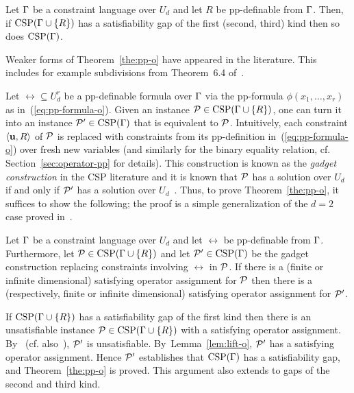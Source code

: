 \begin{theorem}\label{the:pp-o}
  Let $\Gamma$ be a constraint language over $U_d$ and let $R$ be pp-definable from
  $\Gamma$. Then, if ${\rm CSP}(\Gamma\cup\{R\})$ has a satisfiability gap of the first (second, third) kind then so does
  ${\rm CSP}(\Gamma)$.
\end{theorem}

Weaker forms of Theorem~\ref{the:pp-o} have appeared in the literature. This includes for example subdivisions from Theorem~6.4 of~\cite{Mastel24:stoc}.

Let $\rel\subseteq U_d^r$ be a pp-definable formula
over $\Gamma$ via the pp-formula $\phi(x_1,\ldots,x_r)$ as in~(\ref{eq:pp-formula-o}).
Given an instance
${\mathcal P}\in{\rm CSP}(\Gamma\cup\{R\})$, one can turn it into an instance
${\mathcal P}'\in{\rm CSP}(\Gamma)$ that is equivalent to ${\mathcal P}$. 
% 
Intuitively, each constraint $\langle {\bf u},R \rangle$ of ${\mathcal P}$ is replaced with
constraints 
from its pp-definition in~(\ref{eq:pp-formula-o})
over fresh new variables (and similarly for the binary equality relation, cf. Section~\ref{sec:operator-pp} for details).
%
This construction is known as the \emph{gadget construction} in the CSP
literature and it is known that ${\mathcal P}$ has a solution over $U_d$
if and only if ${\mathcal P}'$ has a solution over $U_d$~\cite{Bulatov05:classifying,BKW17}.
%
Thus, to prove Theorem~\ref{the:pp-o}, it suffices to show the following;
the proof is a simple generalization of the $d=2$ case
proved in~\cite{AKS19:jcss}.

\begin{lemma}\label{lem:lift-o}
  Let $\Gamma$ be a constraint language over $U_d$ and let $\rel$ be pp-definable
  from $\Gamma$. Furthermore, let ${\mathcal P}\in{\rm CSP}(\Gamma\cup\{R\})$ and let
  ${\mathcal P}'\in{\rm CSP}(\Gamma)$ be the gadget construction replacing constraints involving
  $\rel$ in ${\mathcal P}$. If there is a (finite or infinite dimensional) satisfying operator assignment for ${\mathcal P}$ then there is a (respectively, finite or infinite dimensional) satisfying operator assignment for ${\mathcal P}'$. 
\end{lemma}

If ${\rm CSP}(\Gamma\cup\{R\})$ has a satisfiability gap of the first kind then there is
an unsatisfiable instance ${\mathcal P}\in{\rm CSP}(\Gamma\cup\{R\})$ with a satisfying
operator assignment. By~\cite{Bulatov05:classifying} (cf.
also~\cite{BKW17}), ${\mathcal P}'$ is unsatisfiable. By~Lemma~\ref{lem:lift-o}, ${\mathcal P}'$ has a satisfying operator assignment. 
Hence ${\mathcal P}'$ establishes that ${\rm CSP}(\Gamma)$ has a satisfiability gap, and
Theorem~\ref{the:pp-o} is proved. This argument also extends to gaps of the second and third kind.


